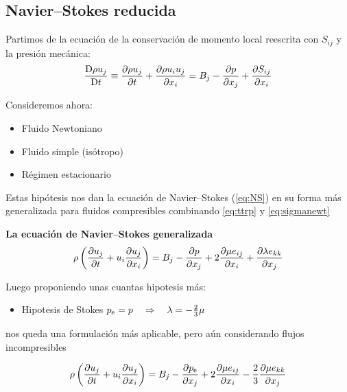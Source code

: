 
\subsection{Navier--Stokes reducida}
Partimos de la ecuación de la conservación de momento local reescrita con $S_{ij}$ y la presión mecánica:
\begin{equation} \label{eq:NewtonSij}
    \frac{\textrm{D} \rho u_j}{\textrm{D} t}\equiv   \frac{\partial \rho u_j}{\partial t}+\frac{\partial \rho u_i u_j}{\partial x_i}=B_j-\frac{\partial p}{\partial x_j}+\frac{\partial S_{ij}}{\partial x_i}
\end{equation}

Consideremos ahora:
\begin{itemize}
\item Fluido Newtoniano
\item Fluido simple (isótropo)
\item Régimen estacionario
\end{itemize}
Estas hipótesis nos dan la ecuación de Navier--Stokes (\ref{eq:NS}) en su forma más generalizada para fluidos compresibles combinando \ref{eq:ttrp} y \ref{eq:sigmanewt}
\begin{mdframed}
\textbf{La ecuación de Navier--Stokes generalizada}
\begin{equation} \label{eq:NS}
     \rho \left( \frac{\partial u_j}{\partial t}+u_i \frac{\partial u_j}{\partial x_i}\right)=B_j-\frac{\partial p}{\partial x_j}+2\frac{\partial \mu e_{ij}}{\partial x_i}+\frac{\partial \lambda e_{kk} }{\partial x_j}
\end{equation}
\end{mdframed}

Luego proponiendo unas cuantas hipotesis más:
\begin{itemize}
\item Hipotesis de Stokes $\pe=p\quad\Rightarrow\quad\lambda = -\frac{2}{3}\mu$
\end{itemize}
nos queda una formulación más aplicable, pero aún considerando flujos incompresibles

\begin{equation}\label{eq:NS_stokesHipotesis}
     \rho \left( \spartial{u_j}{t}+u_i \spartial{u_j}{x_i}\right)=B_j-\spartial{\pe}{x_j}+2\spartial{\mu e_{ij}}{x_i}-\frac{2}{3}\spartial{\mu e_{kk}}{x_j}
\end{equation}

